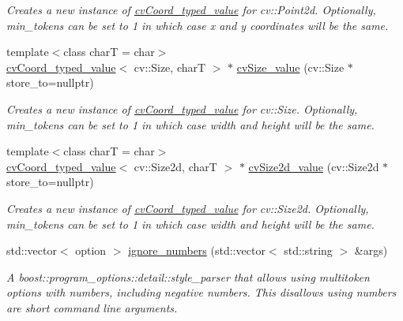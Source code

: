 \begin{DoxyCompactItemize}
\begin{DoxyCompactList}\small\item\em Creates a new instance of \hyperlink{structboost_1_1program__options_1_1cv_coord__typed__value}{cv\+Coord\+\_\+typed\+\_\+value} for cv\+::\+Point2d. Optionally, min\+\_\+tokens can be set to 1 in which case x and y coordinates will be the same. \end{DoxyCompactList}\item 
{\footnotesize template$<$class charT  = char$>$ }\\\hyperlink{structboost_1_1program__options_1_1cv_coord__typed__value}{cv\+Coord\+\_\+typed\+\_\+value}$<$ cv\+::\+Size, charT $>$ $\ast$ \hyperlink{group___imagery_module_gae944e0209fb649650a1c5beac4d60fea}{cv\+Size\+\_\+value} (cv\+::\+Size $\ast$store\+\_\+to=nullptr)
\begin{DoxyCompactList}\small\item\em Creates a new instance of \hyperlink{structboost_1_1program__options_1_1cv_coord__typed__value}{cv\+Coord\+\_\+typed\+\_\+value} for cv\+::\+Size. Optionally, min\+\_\+tokens can be set to 1 in which case width and height will be the same. \end{DoxyCompactList}\item 
{\footnotesize template$<$class charT  = char$>$ }\\\hyperlink{structboost_1_1program__options_1_1cv_coord__typed__value}{cv\+Coord\+\_\+typed\+\_\+value}$<$ cv\+::\+Size2d, charT $>$ $\ast$ \hyperlink{group___imagery_module_gad6ef9cef6acd63e1f9d3adcb4e055cf1}{cv\+Size2d\+\_\+value} (cv\+::\+Size2d $\ast$store\+\_\+to=nullptr)
\begin{DoxyCompactList}\small\item\em Creates a new instance of \hyperlink{structboost_1_1program__options_1_1cv_coord__typed__value}{cv\+Coord\+\_\+typed\+\_\+value} for cv\+::\+Size2d. Optionally, min\+\_\+tokens can be set to 1 in which case width and height will be the same. \end{DoxyCompactList}\item 
std\+::vector$<$ option $>$ \hyperlink{group___utility_module_ga3db1b0bae61386198482fae1645b959d}{ignore\+\_\+numbers} (std\+::vector$<$ std\+::string $>$ \&args)
\begin{DoxyCompactList}\small\item\em A boost\+::program\+\_\+options\+::detail\+::style\+\_\+parser that allows using multitoken options with numbers, including negative numbers. This disallows using numbers are short command line arguments. \end{DoxyCompactList}\item 

\end{DoxyCompactItemize}
